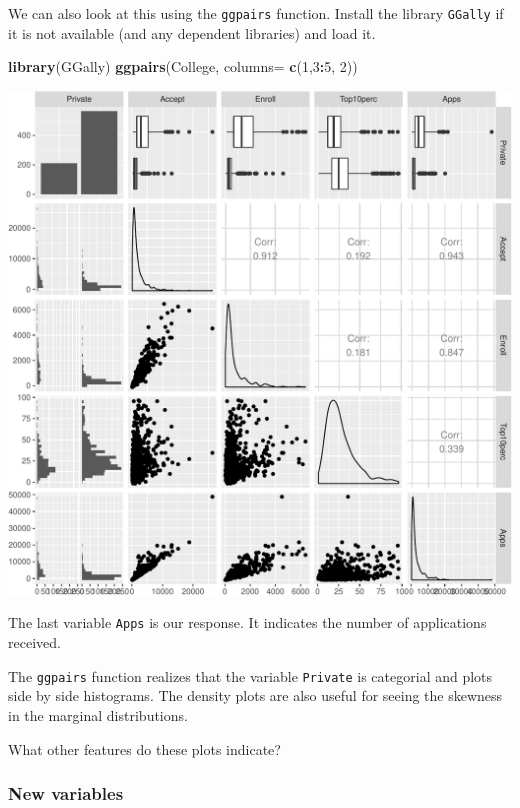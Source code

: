 \documentclass[]{article}
\newenvironment{Shaded}{\begin{snugshade}}{\end{snugshade}}
\newcommand{\KeywordTok}[1]{\textcolor[rgb]{0.13,0.29,0.53}{\textbf{#1}}}
\newcommand{\DataTypeTok}[1]{\textcolor[rgb]{0.13,0.29,0.53}{#1}}
\newcommand{\DecValTok}[1]{\textcolor[rgb]{0.00,0.00,0.81}{#1}}
\newcommand{\OperatorTok}[1]{\textcolor[rgb]{0.81,0.36,0.00}{\textbf{#1}}}
\newcommand{\NormalTok}[1]{#1}
\begin{document}
We can also look at this using the \texttt{ggpairs} function. Install
the library \texttt{GGally} if it is not available (and any dependent
libraries) and load it.

\begin{Shaded}
\begin{Highlighting}[]
\KeywordTok{library}\NormalTok{(GGally)}
\KeywordTok{ggpairs}\NormalTok{(College, }\DataTypeTok{columns=} \KeywordTok{c}\NormalTok{(}\DecValTok{1}\NormalTok{,}\DecValTok{3}\OperatorTok{:}\DecValTok{5}\NormalTok{, }\DecValTok{2}\NormalTok{))}
\end{Highlighting}
\end{Shaded}

\includegraphics{Lab1Q_files/figure-latex/ggpairs-1.pdf}

The last variable \texttt{Apps} is our response. It indicates the number
of applications received.

The \texttt{ggpairs} function realizes that the variable
\texttt{Private} is categorial and plots side by side histograms. The
density plots are also useful for seeing the skewness in the marginal
distributions.

What other features do these plots indicate?

\subsubsection{New variables}\label{new-variables}
\end{document}
